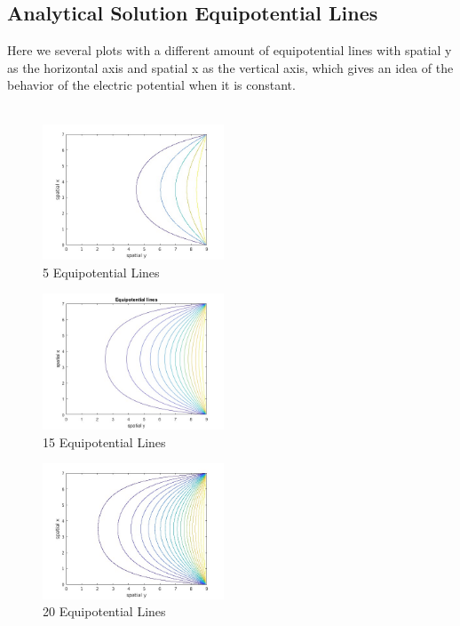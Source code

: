 \documentclass{amsart}
\begin{document}
 \subsection{Analytical Solution Equipotential Lines}
Here we several plots with a different amount of equipotential lines with spatial y as the horizontal axis and spatial x as the vertical axis, which gives an idea of the behavior of the electric potential when it is constant.\\\\
\begin{figure}[H]
    \caption{5 Equipotential Lines}
	\label{5 Equipotential Lines }
	\includegraphics[width=0.48\textwidth]{EL5}
\end{figure}
\begin{figure}[H]
    \caption{15 Equipotential Lines }
	\label{15 Equipotential Lines }
	\includegraphics[width=0.48\textwidth]{EL15}
\end{figure}
\begin{figure}[H]
    \caption{20 Equipotential Lines }
	\label{20 Equipotential Lines }
	\includegraphics[width=0.48\textwidth]{EL20}
\end{figure}
\end{document}
